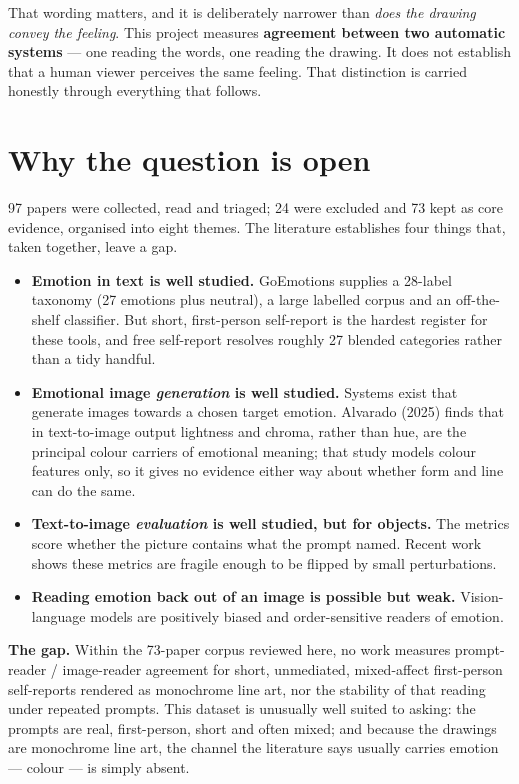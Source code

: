 \documentclass[11pt,a4paper]{article}
\newcommand{\say}[1]{\textit{\color{soft}#1}}
\begin{document}
That wording matters, and it is deliberately narrower than \say{does the drawing convey the
feeling}. This project measures \textbf{agreement between two automatic systems} — one reading the
words, one reading the drawing. It does not establish that a human viewer perceives the same
feeling. That distinction is carried honestly through everything that follows.

\section{Why the question is open}

97 papers were collected, read and triaged; 24 were excluded and 73 kept as core evidence, organised
into eight themes. The literature establishes four things that, taken together, leave a gap.

\begin{itemize}
\item \textbf{Emotion in text is well studied.} GoEmotions supplies a 28-label taxonomy (27 emotions plus
neutral), a large labelled corpus and an off-the-shelf classifier. But short, first-person self-report is the hardest
register for these tools, and free self-report resolves roughly 27 blended categories rather than a
tidy handful.
\item \textbf{Emotional image \emph{generation} is well studied.} Systems exist that generate images
towards a chosen target emotion. Alvarado (2025) finds that in text-to-image output lightness and
chroma, rather than hue, are the principal colour carriers of emotional meaning; that study models
colour features only, so it gives no evidence either way about whether form and line can do the same.
\item \textbf{Text-to-image \emph{evaluation} is well studied, but for objects.} The metrics score
whether the picture contains what the prompt named. Recent work shows these metrics are fragile
enough to be flipped by small perturbations.
\item \textbf{Reading emotion back out of an image is possible but weak.} Vision-language models are
positively biased and order-sensitive readers of emotion.
\end{itemize}

\begin{key}
\textbf{The gap.} Within the 73-paper corpus reviewed here, no work measures prompt-reader /
image-reader agreement for short, unmediated, mixed-affect first-person self-reports rendered as
monochrome line art, nor the stability of that reading under repeated prompts. This dataset is
unusually well suited to asking: the prompts are real, first-person, short and often mixed; and
because the drawings are monochrome line art, the channel the literature says usually carries
emotion --- colour --- is simply absent.
\end{key}
\end{document}
